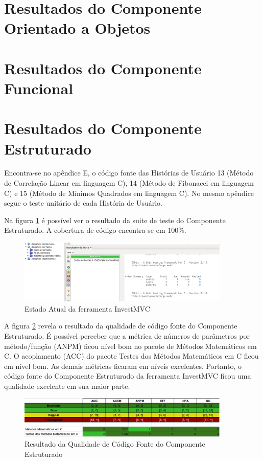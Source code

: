 \section{Resultados do Componente Orientado a Objetos}
\section{Resultados do Componente Funcional}
\section{Resultados do Componente Estruturado}

Encontra-se no apêndice E,  o código fonte das Histórias de Usuário 13 (Método de Correlação Linear em linguagem C), 14 (Método de Fibonacci em linguagem C) e 15 (Método de Mínimos Quadrados em linguagem C). No mesmo apêndice segue o teste unitário de cada História de Usuário.

Na figura \ref{coberturaEstrturado} é possível ver o resultado da suite de teste do Componente Estruturado. A cobertura de código encontra-se em 100\%.

\begin{figure}[H]
\centering
\includegraphics[width=0.9\textwidth]{figuras/coberturaEstruturado}
\caption{Estado Atual da ferramenta InvestMVC}
\label{coberturaEstrturado}
\end{figure}

A figura \ref{qualidadeEstruturado} revela o resultado da qualidade de código fonte do Componente Estruturado. É possível perceber que a métrica de números de parâmetros por método/função (ANPM) ficou nível bom no pacote de Métodos Matemáticos em C. O acoplamento (ACC) do pacote Testes dos Métodos Matemáticos em C ficou em nível bom. As demais métricas ficaram em níveis excelentes. Portanto, o código fonte do Componente Estruturado da  ferramenta InvestMVC ficou uma qualidade excelente em sua maior parte.

\begin{figure}[H]
\centering
\includegraphics[width=0.9\textwidth]{figuras/qualidadeEstruturado}
\caption{Resultado da Qualidade de Código Fonte do Componente Estruturado} 
\label{qualidadeEstruturado}
\end{figure}

